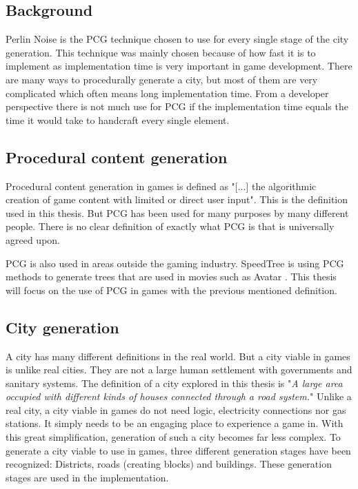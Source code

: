 	\subsection{Background}
	Perlin Noise is the PCG technique chosen to use for every single stage of the city generation. This technique was mainly chosen because of how fast it is to implement as implementation time is very important in game development.
	There are many ways to procedurally generate a city, but most of them are very complicated which often means long implementation time. From a developer perspective there is not much use for PCG if the implementation time equals the time it would take to handcraft every single element.
	
	\subsection{Procedural content generation}
	Procedural content generation in games is defined as "[...] the algorithmic creation of game content with limited or direct user input"\cite{WhatIsPCG}. This is the definition used in this thesis. But PCG has been used for many purposes by many different people. There is no clear definition of exactly what PCG is that is universally agreed upon.\cite{WhatIsPCG}
	
	PCG is also used in areas outside the gaming industry. SpeedTree \cite{SpeedTree} is using PCG methods to generate trees that are used in movies such as Avatar \cite{SpeedTreeMovies}.
	This thesis will focus on the use of PCG in games with the previous mentioned definition.
	
	\subsection{City generation}
	A city has many different definitions in the real world. But a city viable in games is unlike real cities. They are not a large human settlement with governments and sanitary systems. The definition of a city explored in this thesis is "\textit{A large area occupied with different kinds of houses connected through a road system.}"
	Unlike a real city, a city viable in games do not need logic, electricity connections nor gas stations. It simply needs to be an engaging place to experience a game in. With this great simplification, generation of such a city becomes far less complex.
	To generate a city viable to use in games, three different generation stages have been recognized: Districts, roads (creating blocks) and buildings. These generation stages are used in the implementation.
	

